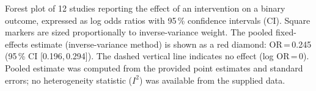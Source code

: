 \caption{Forest plot of 12 studies reporting the effect of an intervention on a binary outcome, expressed as log odds ratios with 95\,\% confidence intervals (CI). Square markers are sized proportionally to inverse-variance weight. The pooled fixed-effects estimate (inverse-variance method) is shown as a red diamond: OR\,=\,0.245 (95\,\% CI [0.196,\,0.294]). The dashed vertical line indicates no effect (log OR\,=\,0). Pooled estimate was computed from the provided point estimates and standard errors; no heterogeneity statistic ($I^2$) was available from the supplied data.}

